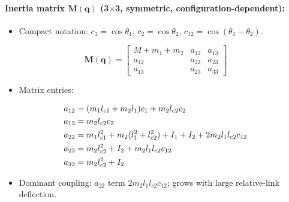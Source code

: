 \documentclass[10pt, a4paper]{article}
\newcommand{\vq}{\boldsymbol{q}}
\newcommand{\Mq}{\mathbf{M}(\vq)}
\begin{document}
\paragraph{Inertia matrix $\Mq$ (3$\times$3, symmetric, configuration-dependent):}
\begin{itemize}[leftmargin=1.5em,itemsep=0.2em]
  \item Compact notation: $c_1=\cos\theta_1$, $c_2=\cos\theta_2$,
  $c_{12}=\cos(\theta_1-\theta_2)$.
\end{itemize}
\begin{equation}
  \Mq =
  \begin{bmatrix}
    M + m_1 + m_2 & a_{12} & a_{13} \\
    a_{12} & a_{22} & a_{23} \\
    a_{13} & a_{23} & a_{33}
  \end{bmatrix}
  \label{eq:Mfull}
\end{equation}
\begin{itemize}[leftmargin=1.5em,itemsep=0.2em]
  \item Matrix entries:
\end{itemize}
\begin{align}
  a_{12} &= (m_1 l_{c1} + m_2 l_1)c_1 + m_2 l_{c2}c_2 \notag\\
  a_{13} &= m_2 l_{c2}c_2 \notag\\
  a_{22} &= m_1 l_{c1}^2 + m_2(l_1^2 + l_{c2}^2) + I_1 + I_2
           + 2m_2 l_1 l_{c2}c_{12} \notag\\
  a_{23} &= m_2 l_{c2}^2 + I_2 + m_2 l_1 l_{c2}c_{12} \notag\\
  a_{33} &= m_2 l_{c2}^2 + I_2
  \label{eq:M_entries}
\end{align}
\begin{itemize}[leftmargin=1.5em,itemsep=0.2em]
  \item Dominant coupling: $a_{22}$ term $2m_2 l_1 l_{c2}c_{12}$; grows with
  large relative-link deflection.
\end{itemize}
\end{document}
